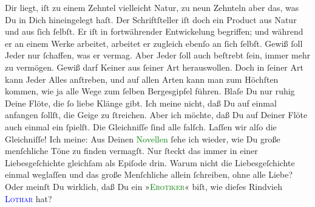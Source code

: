                Dir liegt, iſt zu einem Zehntel vielleicht Natur, zu  neun Zehnteln aber das, was Du in Dich hineingelegt haſt. Der
               Schriftſteller iſt doch ein Product aus Natur und aus ſich ſelbſt. Er iſt in
               fortwährender Entwickelung begriffen; und {\pb}während
               er an einem Werke arbeitet, \strikeout{\textcolor{gray}{arb}} arbeitet er zugleich ebenſo an ſich ſelbſt. Gewiß ſoll Jeder nur ſchaffen, was
               er vermag. Aber Jeder ſoll auch beſtrebt ſein, 
               immer mehr zu vermögen. Gewiß darf Keiner aus ſeiner Art herauswollen. Doch in ſeiner
               Art kann Jeder Alles anſtreben, und auf allen Arten kann man zum Höchſten kommen, wie
                   ja alle Wege zum ſelben Bergesgipfel führen.
               Blaſe Du nur ruhig Deine Flöte, die ſo liebe Klänge gibt. Ich meine  nicht, daß Du auf einmal anfangen ſollſt, die
               Geige zu ſtreichen. Aber ich möchte, daß Du auf Deiner Flöte auch  einmal ein \label{K_L02861-2v}\label{K_L02861-2h} ſpielſt. Die Gleichniſſe ſind alle falſch. Laſſen wir alſo die Gleichniſſe!
               Ich meine: Aus Deinen \textcolor{green}{Novellen}{}
               ſehe ich wieder,  wie Du große menſchliche Töne zu finden vermagſt. Nur ſteckt das immer in
               einer Liebesgeſchichte gleichſam als Epiſode drin. Warum nicht die Liebesgeſchichte
               einmal weglaſſen und das große Menſchliche \strikeout{\textcolor{gray}{al}}{ } allein ſchreiben, ohne alle Liebe? Oder meinſt Du
               wirklich, daß Du ein »\textsc{\textcolor{green}{Erotiker}{}}« biſt, wie dieſes Rindvieh \textsc{\textcolor{blue}{Lothar}{}\ledrightnote{\textcolor{blue}{Rudolf Lothar}}}{ }\label{K_L02861-3v}\label{K_L02861-3h} hat?\pend
